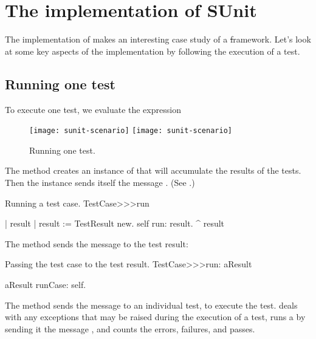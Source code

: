 \documentclass[a4paper,10pt,twoside]{book}
\begin{document}
\section{The implementation of SUnit}

The implementation of \sunit makes an interesting case study of a \st framework.
Let's look at some key aspects of the implementation by following the execution of a test.
\subsection{Running one test}

To execute one test, we evaluate the expression 


\begin{figure}[tbh]
  \begin{center}
  	\ifluluelse
		{\texttt{[image: sunit-scenario]}}
		{\texttt{[image: sunit-scenario]}}
	\caption{Running one test.}
	\label{fig:sunit-scenario}
  \end{center}
\end{figure}

The method  creates an instance of  that will accumulate the results of the tests.
Then the  instance sends itself the message .
(See .)

\begin{method}[tastecaserun]{Running a test case.}
TestCase>>>run

	| result |
	result := TestResult new.
	self run: result.
	^ result
\end{method}

The method  sends the message  to the test result:

\begin{method}[testcaserun:]{Passing the test case to the test result.}
TestCase>>>run: aResult

	aResult runCase: self.
\end{method}

The method  sends the message  to an individual test, to execute the test.
 deals with any exceptions that may be raised during the execution of a test, runs a  by sending it the message , and counts the errors, failures, and passes.
\end{document}
